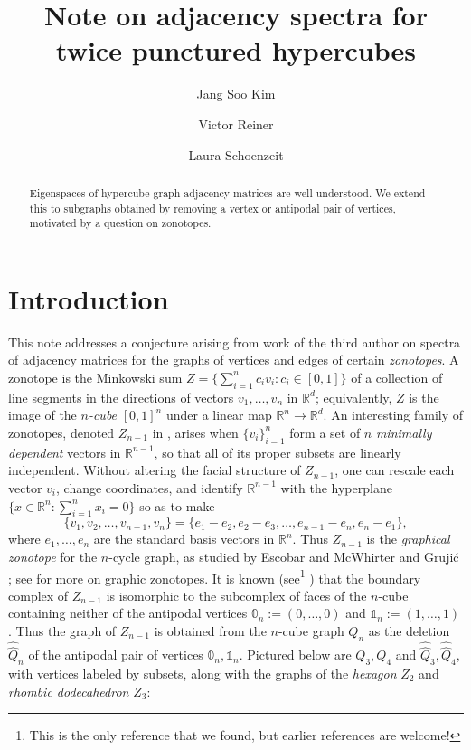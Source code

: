 \documentclass[10pt]{amsart}
\author{Jang Soo Kim}
\author{Victor Reiner}
\author{Laura Schoenzeit}
\title{Note on adjacency spectra for twice punctured hypercubes}
\theoremstyle{plain}
\newcommand{\zero}{\mathbb{0}}
\newcommand{\one}{\mathbb{1}}
\newcommand{\RR}{\mathbb{R}}
\begin{document}
\begin{abstract}
Eigenspaces of hypercube graph adjacency matrices are well understood. We extend this to subgraphs obtained by removing a vertex or antipodal pair of vertices, motivated by a question on zonotopes.
\end{abstract}



\maketitle









\section{Introduction}
\label{sec:intro}

This note addresses a conjecture \cite[Conj.~3.3]{schoenzeit} arising from work of the third author
on spectra of adjacency matrices for the graphs of vertices and edges of certain {\it zonotopes}. A zonotope is the Minkowski sum
$
Z=\{\sum_{i=1}^n c_i v_i: c_i \in [0,1]\}
$
of a collection of line segments in the directions of vectors $v_1,\ldots,v_n$ in $\RR^d$;  equivalently, $Z$ is the image of the {\it $n$-cube} $[0,1]^n$ under a linear map $\RR^n \rightarrow \RR^d$.
An interesting family of zonotopes, 
denoted $Z_{n-1}$ in \cite{schoenzeit},
arises when $\{v_i\}_{i=1}^n$ form a set of $n$ {\it minimally dependent} vectors in $\RR^{n-1}$,
so that all of its proper subsets are linearly independent.  Without altering the facial structure of $Z_{n-1}$, one can rescale each vector $v_i$, change coordinates,
and identify $\RR^{n-1}$ with the hyperplane $\{x\in\RR^n:\sum_{i=1}^n x_i=0\}$ so as to make
$$
\{v_1,v_2,\ldots,v_{n-1},v_n\}=\{e_1-e_2,e_2-e_3,\ldots,e_{n-1}-e_n,e_n-e_1\},
$$
where $e_1,\ldots,e_n$ are the standard basis vectors in $\RR^n$.  Thus $Z_{n-1}$ is the {\it graphical zonotope} for the $n$-cycle graph, as studied by Escobar and McWhirter \cite{escobarmcwhirter} and
Gruji\'c \cite{Grujic}; see \cite[\S2]{Grujic} for more on graphic zonotopes.
It is known (see\footnote{This is the only reference that we found, but earlier references are welcome!} \cite[Cor.~3.7]{escobarmcwhirter}) that the
boundary complex of $Z_{n-1}$ is isomorphic to the subcomplex of faces of
the $n$-cube containing neither of the antipodal vertices \(\zero_n:=(0,\dots,0)\) and \( \one_n:=(1,\dots,1) \). Thus the graph of $Z_{n-1}$
is obtained from the $n$-cube graph $Q_n$ as the deletion $\hat{\hat{Q}}_n$ of the antipodal pair of vertices $\zero_n, \one_n$.  Pictured below are $Q_3, Q_4$ and $\hat{\hat{Q}}_3,\hat{\hat{Q}}_4$, with vertices labeled by subsets, along with the graphs of the {\it hexagon} $Z_2$ and {\it rhombic dodecahedron} $Z_3$:
\end{document}
